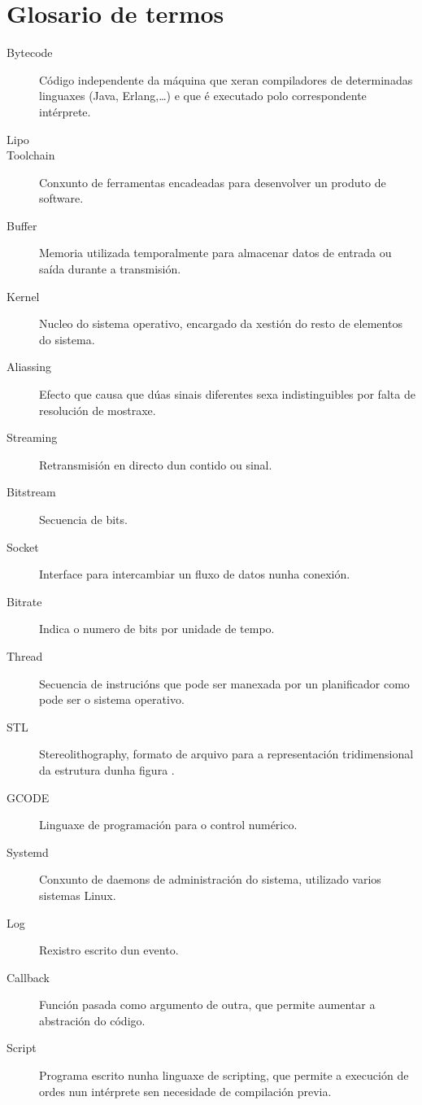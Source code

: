 \chapter{Glosario de termos}
\label{chap:glosario-termos}


\begin{description}
 \item [Bytecode] Código independente da máquina que xeran
   compiladores de determinadas linguaxes (Java, Erlang,\dots) e que
   é executado polo correspondente intérprete.
 \item [Lipo]
 \item [Toolchain] Conxunto de ferramentas encadeadas para desenvolver
 un produto de software.
 \item [Buffer] Memoria utilizada temporalmente para almacenar datos de
 entrada ou saída durante a transmisión.
 \item [Kernel] Nucleo do sistema operativo, encargado da xestión do resto
 de elementos do sistema.
 \item [Aliassing] Efecto que causa que dúas sinais diferentes sexa indistinguibles
 por falta de resolución de mostraxe.
 \item [Streaming] Retransmisión en directo dun contido ou sinal.
 \item [Bitstream] Secuencia de bits.
 \item [Socket] Interface para intercambiar un fluxo de datos nunha conexión.
 \item [Bitrate] Indica o numero de bits por unidade de tempo.
 \item [Thread] Secuencia de instrucións que pode ser manexada por un planificador
 como pode ser o sistema operativo.
 \item [STL] Stereolithography, formato de arquivo para a representación
 tridimensional da estrutura dunha figura .
 \item [GCODE] Linguaxe de programación para o control numérico.
 \item [Systemd] Conxunto de daemons de administración do sistema, utilizado
  varios sistemas Linux.
 \item [Log] Rexistro escrito dun evento.
 \item [Callback] Función pasada como argumento de outra, que permite aumentar
 a abstración do código.
 \item [Script] Programa escrito nunha linguaxe de scripting, que permite a execución
 de ordes nun intérprete sen necesidade de compilación previa.

\end{description}
